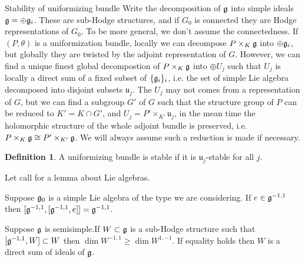 \documentclass[aspectratio=169, 10pt]{beamer}
\theoremstyle{definition}
\newtheorem{Def}{Definition}
\theoremstyle{example}
\begin{document}
	\begin{frame}{Stability of uniformizing bundle}
		Write the decomposition of $\mathfrak{g}$ into simple ideals $\mathfrak{g}=\oplus \mathfrak{g}_i$. These are sub-Hodge structures, and if $G_0$ is connected they are Hodge representations of $G_0$. To be more general, we don't assume the connectedness. If $(P,\theta)$ is a uniformization bundle, locally we can decompose $P\times_K \mathfrak{g}$ into $\oplus \mathfrak{g}_i$, but globally they are twisted by the adjoint representation of $G$. However, we can find a unique finest global decompostion of $P\times_K \mathfrak{g}$ into $\oplus U_j$ such that $U_j$ is locally a direct sum of a fixed subset of $\{\mathfrak{g}_i\}_i$, i.e. the set of simple Lie algebra decomposed into disjoint subsets $\mathfrak{u}_j$. The $U_j$ may not comes from a representation of $G$, but we can find a subgroup $G'$ of $G$ such that the structure group of $P$ can be reduced to $K'=K\cap G'$, and $U_j=P'\times_{K'} \mathfrak{u}_j$, in the mean time the holomorphic structure of the whole adjoint bundle is preserved, i.e. $P\times_K \mathfrak{g}\cong P'\times_{K'} \mathfrak{g}$. We will always assume such a reduction is made if necessary. 
		\begin{Def}
			A uniformizing bundle is stable if it is $\mathfrak{u}_j$-stable for all $j$.
		\end{Def}
	\end{frame}
	\begin{frame}
		Let call for a lemma about Lie algebras.
		\begin{lemma}
			Suppose $\mathfrak{g}_0$ is a simple Lie algebra of the type we are considering. If $e\in \mathfrak{g}^{-1,1}$ then $[\mathfrak{g}^{-1,1},[\mathfrak{g}^{-1,1},e]]=\mathfrak{g}^{-1,1}$.
		\end{lemma}
		\begin{corollary}\label{cor9.3}
			Suppose $\mathfrak{g}$ is semisimple.If $W\subset \mathfrak{g}$ is a sub-Hodge structure such that $[\mathfrak{g}^{-1,1},W]\subset W$ then $\dim W^{-1,1}\geq \dim W^{1,-1}$. If equality holds then $W$ is a direct sum of ideals of $\mathfrak{g}$.
		\end{corollary}
		
	\end{frame}
\end{document}
